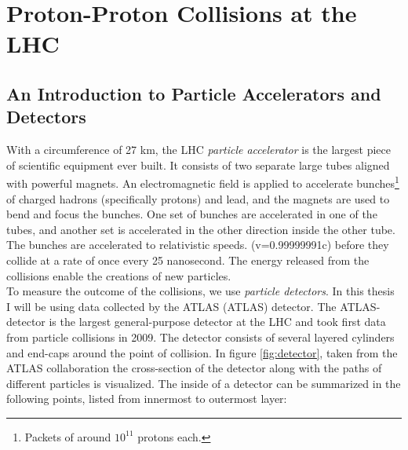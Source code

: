 \section{Proton-Proton Collisions at the LHC}
\subsection{An Introduction to Particle Accelerators and Detectors}\label{subsec:Detector}
With a circumference of 27 km, the \acf{LHC} \emph{particle accelerator} is the largest piece of scientific 
equipment ever built. It consists of two separate large tubes aligned with powerful magnets. An electromagnetic field is
applied to accelerate bunches\footnote{Packets of around $10^{11}$ protons each.} of charged hadrons (specifically protons) and lead,
and the magnets are used to bend and focus the bunches. One set of bunches are accelerated in one of the tubes, 
and another set is accelerated in the other direction inside the other tube. The bunches are accelerated to relativistic speeds.
(v=0.99999991c) before they collide at a rate of once every 25 nanosecond. The energy released from 
the collisions enable the creations of new particles.
\\
To measure the outcome of the collisions, we use \emph{particle detectors}. In this thesis I will be using data collected by the 
\acs{ATLAS} (\acl{ATLAS}) detector. The \ac{ATLAS}-detector is the largest general-purpose detector at the \ac{LHC}
and took first data from particle collisions in 2009. The detector consists of several layered cylinders and end-caps 
around the point of collision. In figure \ref{fig:detector}, taken from the \ac{ATLAS} collaboration \cite{PDetector} the cross-section 
of the detector along with the paths of different particles is visualized. The inside of a detector can be summarized 
in the following points, listed from innermost to outermost layer:
